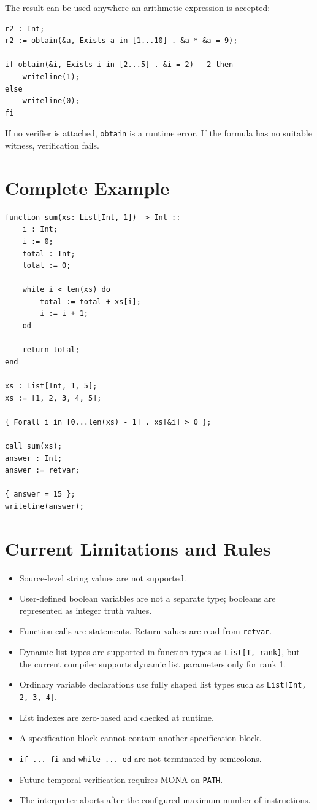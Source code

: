 \documentclass[11pt]{article}
\begin{document}
The result can be used anywhere an arithmetic expression is accepted:

\begin{lstlisting}
r2 : Int;
r2 := obtain(&a, Exists a in [1...10] . &a * &a = 9);

if obtain(&i, Exists i in [2...5] . &i = 2) - 2 then
    writeline(1);
else
    writeline(0);
fi
\end{lstlisting}

If no verifier is attached, \texttt{obtain} is a runtime error. If the formula has no suitable witness, verification fails.

\section{Complete Example}

\begin{lstlisting}
function sum(xs: List[Int, 1]) -> Int ::
    i : Int;
    i := 0;
    total : Int;
    total := 0;

    while i < len(xs) do
        total := total + xs[i];
        i := i + 1;
    od

    return total;
end

xs : List[Int, 1, 5];
xs := [1, 2, 3, 4, 5];

{ Forall i in [0...len(xs) - 1] . xs[&i] > 0 };

call sum(xs);
answer : Int;
answer := retvar;

{ answer = 15 };
writeline(answer);
\end{lstlisting}

\section{Current Limitations and Rules}

\begin{itemize}
  \item Source-level string values are not supported.
  \item User-defined boolean variables are not a separate type; booleans are represented as integer truth values.
  \item Function calls are statements. Return values are read from \texttt{retvar}.
  \item Dynamic list types are supported in function types as \texttt{List[T, rank]}, but the current compiler supports dynamic list parameters only for rank 1.
  \item Ordinary variable declarations use fully shaped list types such as \texttt{List[Int, 2, 3, 4]}.
  \item List indexes are zero-based and checked at runtime.
  \item A specification block cannot contain another specification block.
  \item \texttt{if ... fi} and \texttt{while ... od} are not terminated by semicolons.
  \item Future temporal verification requires MONA on \texttt{PATH}.
  \item The interpreter aborts after the configured maximum number of instructions.
\end{itemize}
\end{document}
